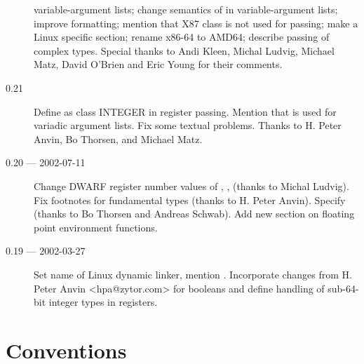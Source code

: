 \documentclass[12pt]{report}
\begin{document}
\begin{description}
  variable-argument lists; change semantics of \RAX in
  variable-argument lists; improve formatting; mention that X87 class
  is not used for passing; make  a Linux specific
  section; rename x86-64 to AMD64; describe passing of complex types.
  Special thanks to Andi Kleen, Michal Ludvig, Michael Matz, David
  O'Brien and Eric Young for their comments.
\item[0.21] Define  as class INTEGER in register
  passing.  Mention that  is used for variadic argument lists.  Fix
  some textual problems.  Thanks to H. Peter Anvin, Bo Thorsen, and
  Michael Matz.
\item[0.20 --- 2002-07-11] Change DWARF register number values of
  \RBX, \RSI, \RSI (thanks to Michal Ludvig).  Fix footnotes for
  fundamental types (thanks to H. Peter Anvin). Specify 
  (thanks to Bo Thorsen and Andreas Schwab).  Add new section on
  floating point environment functions.
\item[0.19 --- 2002-03-27] Set name of Linux dynamic linker, mention
  .
  Incorporate changes from H. Peter Anvin <hpa@zytor.com>
  for booleans and define handling of sub-64-bit integer types in
  registers.
\end{description}










\chapter{Conventions}




\appendix



\end{document}
